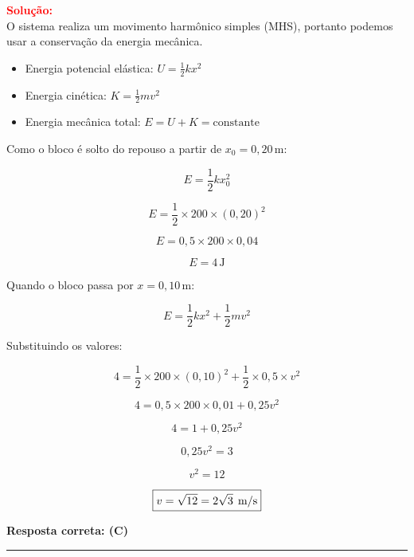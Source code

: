 \documentclass[a4paper,12pt]{article}
\begin{document}
\begin{flushleft}
\begin{center}
\end{center}

\textcolor{red}{\textbf{Solução:}}\\

O sistema realiza um movimento harmônico simples (MHS), portanto podemos usar a conservação da energia mecânica.

\begin{itemize}
\item Energia potencial elástica: $U = \frac{1}{2} k x^2$
\item Energia cinética: $K = \frac{1}{2} m v^2$
\item Energia mecânica total: $E = U + K = \text{constante}$
\end{itemize}

Como o bloco é solto do repouso a partir de $x_0 = 0,20\, \text{m}$:

\[
E = \frac{1}{2} k x_0^2
\]

\[
E = \frac{1}{2} \times 200 \times (0,20)^2
\]

\[
E = 0,5 \times 200 \times 0,04
\]

\[
E = 4\, \text{J}
\]

Quando o bloco passa por $x = 0,10\, \text{m}$:

\[
E = \frac{1}{2} k x^2 + \frac{1}{2} m v^2
\]

Substituindo os valores:

\[
4 = \frac{1}{2} \times 200 \times (0,10)^2 + \frac{1}{2} \times 0,5 \times v^2
\]

\[
4 = 0,5 \times 200 \times 0,01 + 0,25 v^2
\]

\[
4 = 1 + 0,25 v^2
\]

\[
0,25 v^2 = 3
\]

\[
v^2 = 12
\]

\[
\boxed{v = \sqrt{12} = 2\sqrt{3} \hspace{0.15cm} \text{m/s}}
\]


\textbf{Resposta correta: \colorbox{green!50}{(C)}}

\end{flushleft}

\noindent\rule{\linewidth}{0.6pt}\\
\end{document}
